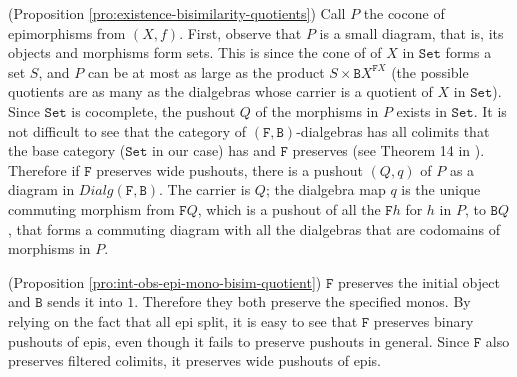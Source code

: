 \documentclass[orivec]{llncs}
\newcommand{\mC}[1]{\mathtt{#1}}
\newcommand{\mF}[1]{\mathtt{#1}}
\newcommand{\Set}{\mC{Set}}
\newcommand{\F}{\mF{F}}
\newcommand{\B}{\mF{B}}
\newcommand{\dialg}{\mathit{Dialg}}
\newcommand{\proend}{\medskip}
\renewenvironment{proof}{\begin{pro}}{\proend\end{pro}}
\begin{document}
\begin{proof}(Proposition \ref{pro:existence-bisimilarity-quotients})
  Call $P$ the cocone of epimorphisms from $(X,f)$. First, observe that $P$ is a small diagram, that is, its objects and morphisms form sets. This is since the cone of of $X$ in $\Set$ forms a set $S$, and $P$ can be at most as large as the product $S \times \B X^{\F X}$ (the possible quotients are as many as the dialgebras whose carrier is a quotient of $X$ in $\Set$). Since $\Set$ is cocomplete, the pushout $Q$ of the morphisms in $P$ exists in $\Set$.  It is not difficult to see that the category of $(\F,\B)$-dialgebras has all colimits that the base category ($\Set$ in our case) has and $\F$ preserves (see Theorem 14 in \cite{Vou10}). Therefore if $\F$ preserves wide pushouts, there is a pushout $(Q,q)$ of $P$ as a diagram in $\dialg(\F,\B)$. The carrier is $Q$; the dialgebra map $q$ is the unique commuting morphism from $\F Q$, which is a pushout of all the $\F h$ for $h$ in $P$, to $\B Q$, that forms a commuting diagram with all the dialgebras that are codomains of morphisms in $P$.
\end{proof}

\begin{proof}(Proposition \ref{pro:int-obs-epi-mono-bisim-quotient})
	$\F$ preserves the initial object and $\B$ sends it into $1$. Therefore they both preserve the specified monos.  By relying on the fact that all epi split, it is easy to see that $\F$ preserves binary pushouts of epis, even though it fails to preserve pushouts in general. Since $\F$ also preserves filtered colimits, it preserves wide pushouts of epis. 
\end{proof}
\end{document}
